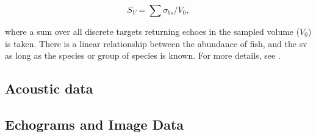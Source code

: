     \begin{equation}
        S_{V} = \sum \sigma_{bs} / V_{0},
    \end{equation}
    
    where a sum over all discrete targets returning echoes in the sampled volume ($V_{0}$) is taken. There is a linear relationship between the abundance of fish, and the \gls{sv} as long as the species or group of species is known. For more details, see \citet{simmonds2008fisheries}.
    
\subsection{Acoustic data}


\subsection{Echograms and Image Data} \label{echosounder and image data acoustic }

    \cite{brautaset2020acoustic}
    
